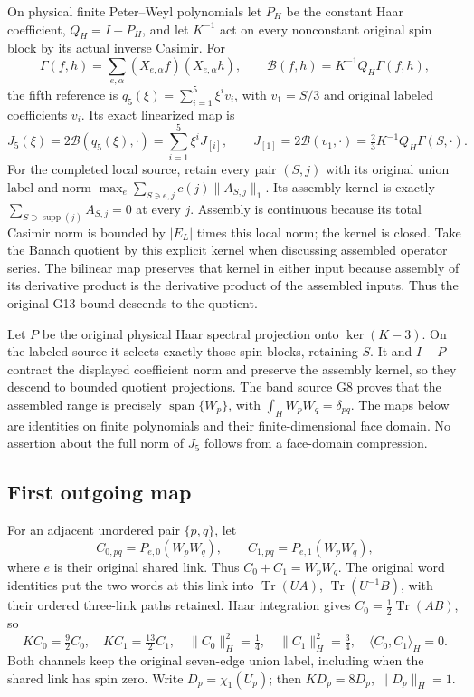 \documentclass[11pt]{article}
\begin{document}
On physical finite Peter–Weyl polynomials let \(P_H\) be the constant Haar coefficient, \(Q_H=I-P_H\), and let \(K^{-1}\) act on every nonconstant original spin block by its actual inverse Casimir. For
\[
 \Gamma(f,h)=\sum_{e,\alpha}(X_{e,\alpha}f)(X_{e,\alpha}h),\qquad
 \mathcal B(f,h)=K^{-1}Q_H\Gamma(f,h),
\]
the fifth reference is \(q_5(\xi)=\sum_{i=1}^5\xi^iv_i\), with \(v_1=S/3\) and original labeled coefficients \(v_i\). Its exact linearized map is
\[
 J_5(\xi)=2\mathcal B(q_5(\xi),\cdot)
 =\sum_{i=1}^5\xi^iJ_{[i]},\qquad
 J_{[1]}=2\mathcal B(v_1,\cdot)=\tfrac23K^{-1}Q_H\Gamma(S,\cdot).
\]
For the completed local source, retain every pair \((S,j)\) with its original union label and norm \(\max_e\sum_{S\ni e,j}c(j)\|A_{S,j}\|_1\). Its assembly kernel is exactly \(\sum_{S\supset\operatorname{supp}(j)}A_{S,j}=0\) at every \(j\). Assembly is continuous because its total Casimir norm is bounded by \(|E_L|\) times this local norm; the kernel is closed. Take the Banach quotient by this explicit kernel when discussing assembled operator series. The bilinear map preserves that kernel in either input because assembly of its derivative product is the derivative product of the assembled inputs. Thus the original G13 bound descends to the quotient.

Let \(P\) be the original physical Haar spectral projection onto \(\ker(K-3)\). On the labeled source it selects exactly those spin blocks, retaining \(S\). It and \(I-P\) contract the displayed coefficient norm and preserve the assembly kernel, so they descend to bounded quotient projections. The band source G8 proves that the assembled range is precisely \(\operatorname{span}\{W_p\}\), with \(\int_HW_pW_q=\delta_{pq}\). The maps below are identities on finite polynomials and their finite-dimensional face domain. No assertion about the full norm of \(J_5\) follows from a face-domain compression.

\subsection*{First outgoing map}

For an adjacent unordered pair \(\{p,q\}\), let
\[
 C_{0,pq}=P_{e,0}(W_pW_q),\qquad C_{1,pq}=P_{e,1}(W_pW_q),
\]
where \(e\) is their original shared link. Thus \(C_0+C_1=W_pW_q\). The original word identities put the two words at this link into \(\operatorname{Tr}(UA)\), \(\operatorname{Tr}(U^{-1}B)\), with their ordered three-link paths retained. Haar integration gives \(C_0=\tfrac12\operatorname{Tr}(AB)\), so
\[
 KC_0=\tfrac92C_0,\quad KC_1=\tfrac{13}2C_1,\quad
 \|C_0\|_H^2=\tfrac14,\quad\|C_1\|_H^2=\tfrac34,\quad
 \langle C_0,C_1\rangle_H=0.
\]
Both channels keep the original seven-edge union label, including when the shared link has spin zero. Write \(D_p=\chi_1(U_p)\); then \(KD_p=8D_p\), \(\|D_p\|_H=1\).
\end{document}
